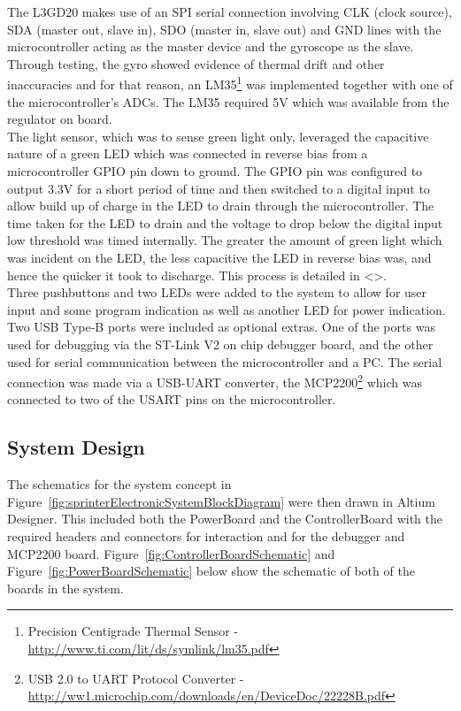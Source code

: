     The L3GD20 makes use of an SPI serial connection involving CLK (clock source), SDA (master out, slave in), SDO (master in, slave out) and GND lines with the microcontroller acting as the master device and the gyroscope as the slave. Through testing, the gyro showed evidence of thermal drift and other inaccuracies and for that reason, an LM35\footnote{Precision Centigrade Thermal Sensor - \url{http://www.ti.com/lit/ds/symlink/lm35.pdf}} was implemented together with one of the microcontroller's ADCs. The LM35 required 5V which was available from the regulator on board.\\

    The light sensor, which was to sense green light only, leveraged the capacitive nature of a green LED which was connected in reverse bias from a microcontroller GPIO pin down to ground. The GPIO pin was configured to output 3.3V for a short period of time and then switched to a digital input to allow build up of charge in the LED to drain through the microcontroller. The time taken for the LED to drain and the voltage to drop below the digital input low threshold was timed internally. The greater the amount of green light which was incident on the LED, the less capacitive the LED in reverse bias was, and hence the quicker it took to discharge. This process is detailed in <>.\\

    Three pushbuttons and two LEDs were added to the system to allow for user input and some program indication as well as another LED for power indication.\\

    Two USB Type-B ports were included as optional extras. One of the ports was used for debugging via the ST-Link V2 on chip debugger board, and the other used for serial communication between the microcontroller and a PC. The serial connection was made via a USB-UART converter, the MCP2200\footnote{USB 2.0 to UART Protocol Converter - \url{http://ww1.microchip.com/downloads/en/DeviceDoc/22228B.pdf}} which was connected to two of the USART pins on the microcontroller.

  \subsection{System Design}
  \label{sub:System Design}
    The schematics for the system concept in Figure~\ref{fig:sprinterElectronicSystemBlockDiagram} were then drawn in Altium Designer. This included both the PowerBoard and the ControllerBoard with the required headers and connectors for interaction and for the debugger and MCP2200 board. Figure~\ref{fig:ControllerBoardSchematic} and Figure~\ref{fig:PowerBoardSchematic} below show the schematic of both of the boards in the system.

